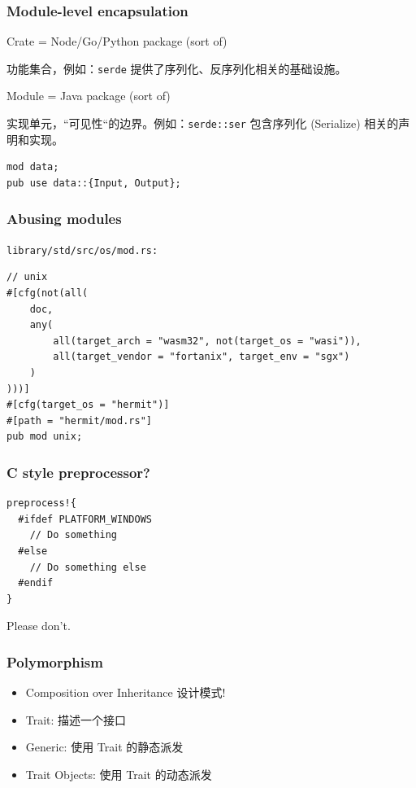 \documentclass[UTF-8]{ctexbeamer}
\begin{document}
\begin{frame}[fragile]
  \frametitle{Module-level encapsulation}

  Crate = Node/Go/Python package (sort of)

  功能集合，例如：\texttt{serde} 提供了序列化、反序列化相关的基础设施。

  \pause
  \vspace{1em}

  Module = Java package (sort of)

  实现单元，“可见性“的边界。例如：\texttt{serde::ser} 包含序列化 (Serialize) 相关的声明和实现。

  \pause
  \vspace{1em}

  \begin{verbatim}
mod data;
pub use data::{Input, Output};
  \end{verbatim}
\end{frame}

\begin{frame}[fragile]
  \frametitle{Abusing modules}

  \texttt{library/std/src/os/mod.rs:}

  \begin{verbatim}
// unix
#[cfg(not(all(
    doc,
    any(
        all(target_arch = "wasm32", not(target_os = "wasi")),
        all(target_vendor = "fortanix", target_env = "sgx")
    )
)))]
#[cfg(target_os = "hermit")]
#[path = "hermit/mod.rs"]
pub mod unix;
  \end{verbatim}
\end{frame}

\begin{frame}[fragile]
  \frametitle{C style preprocessor?}

  \pause

  \begin{verbatim}
preprocess!{
  #ifdef PLATFORM_WINDOWS
    // Do something
  #else
    // Do something else
  #endif
}
  \end{verbatim}

  \pause
  \vspace{1em}

  Please don't.
  
\end{frame}

\begin{frame}
  \frametitle{Polymorphism}

  \begin{itemize}
    \item Composition over Inheritance {\tiny{设计模式!}}
    \item Trait: 描述一个接口
    \pause
    \item Generic: 使用 Trait 的静态派发
    \item Trait Objects: 使用 Trait 的动态派发
  \end{itemize}
\end{frame}
\end{document}
